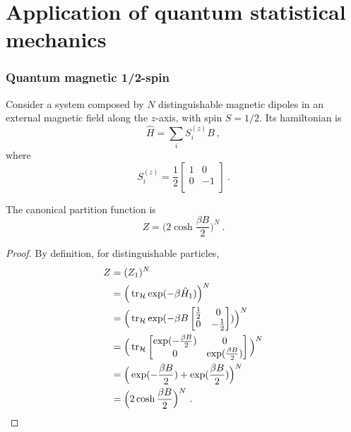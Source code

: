 \part{Application of quantum statistical mechanics}

\section{Quantum magnetic 1/2-spin}

    Consider a system composed by $N$ distinguishable magnetic dipoles in an external magnetic field along the $z$-axis, with spin $S = 1/2$. Its hamiltonian is 
    \begin{equation*}
        \hat H = \sum_i S^{(z)}_i B ~,
    \end{equation*}
    where
    \begin{equation*}
        S^{(z)}_i = \frac{1}{2} \begin{bmatrix}
            1 & 0 \\
            0 & -1 \\
        \end{bmatrix} ~.
    \end{equation*}

    The canonical partition function is 
    \begin{equation*}
        Z = \Big ( 2 \cosh \frac{\beta B}{2} \Big)^N ~.
    \end{equation*}
    \begin{proof}
        By definition, for distinguishable particles,
        \begin{equation*}
        \begin{aligned}
            Z & = (Z_1)^N \\ & = \Big (\operatorname{tr}_{\mathcal H} \exp(- \beta \hat H_1) \Big)^N \\ & = \Big (\operatorname{tr}_{\mathcal H} \exp(- \beta B \begin{bmatrix}
                \frac{1}{2} & 0 \\ 0 & - \frac{1}{2} \\ 
            \end{bmatrix}) \Big)^N \\ & = \Big(\operatorname{tr}_{\mathcal H} \begin{bmatrix}
                \exp(- \frac{\beta B}{2}) & 0 \\ 0 & \exp(\frac{\beta B}{2}) \\ 
            \end{bmatrix} \Big )^N \\ & = \Big( \exp(- \frac{\beta B}{2}) + \exp(\frac{\beta B}{2}) \Big)^N \\ & = \Big ( 2 \cosh \frac{\beta B}{2} \Big)^N ~.
        \end{aligned}
        \end{equation*}
    \end{proof}

